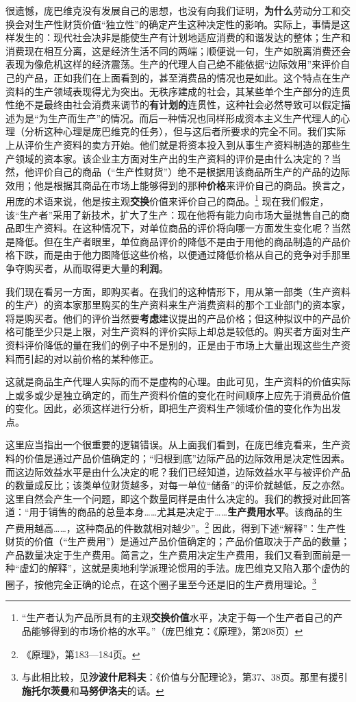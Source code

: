 \documentclass[fontset=fandol, a4paper, 12pt, openright]{ctexbook}
\begin{document}
很遗憾，庞巴维克没有发展自己的思想，也没有向我们证明，\textbf{为什么}劳动分工和交换会对生产性财货价值“独立性”的确定产生这种决定性的影响。实际上，事情是这样发生的：现代社会决非是能使生产有计划地适应消费的和谐发达的整体；生产和消费现在相互分离，这是经济生活不同的两端；顺便说一句，生产如脱离消费还会表现为像危机这样的经济震荡。生产的代理人自己绝不能依据“边际效用”来评价自己的产品，正如我们在上面看到的，甚至消费品的情况也是如此。这个特点在生产资料的生产领域表现得尤为突出。无秩序建成的社会，其某些单个生产部分的连贯性绝不是最终由社会消费来调节的\textbf{有计划的}连贯性，这种社会必然导致可以假定描述为是“为生产而生产”的情况。而后一种情况也同样形成资本主义生产代理人的心理（分析这种心理是庞巴维克的任务），但与这后者所要求的完全不同。我们实际上从评价生产资料的卖方开始。他们就是将资本投入到从事生产资料制造的那些生产领域的资本家。该企业主方面对生产出的生产资料的评价是由什么决定的？当然，他评价自己的商品（“生产性财货”）绝不是根据用该商品所生产的产品的边际效用；他是根据其商品在市场上能够得到的那种\textbf{价格}来评价自己的商品。换言之，用庞的术语来说，他是按主观\textbf{交换}价值来评价自己的商品。\footnote{“生产者认为产品所具有的主观\textbf{交换价值}水平，决定于每一个生产者自己的产品能够得到的市场价格的水平。”（庞巴维克：《原理》，第208页）} 现在我们假定，该“生产者”采用了新技术，扩大了生产：现在他将有能力向市场大量抛售自己的商品即生产资料。在这种情况下，对单位商品的评价将向哪一方面发生变化呢？当然是降低。但在生产者眼里，单位商品评价的降低不是由于用他的商品制造的产品价格下跌，而是由于他力图降低这些价格，以便通过降低价格从自己的竞争对手那里争夺购买者，从而取得更大量的\textbf{利润}。

我们现在看另一方面，即购买者。在我们的这种情形下，用从第一部类（生产资料的生产）的资本家那里购买的生产资料来生产消费资料的那个工业部门的资本家，将是购买者。他们的评价当然要\textbf{考虑}建议提出的产品价格；但这种拟议中的产品价格可能至少只是上限，对生产资料的评价实际上却总是较低的。购买者方面对生产资料评价降低的量在我们的例子中不是别的，正是由于市场上大量出现这些生产资料而引起的对以前价格的某种修正。

这就是商品生产代理人实际的而不是虚构的心理。由此可见，生产资料的价值实际上或多或少是独立确定的，而生产资料价值的变化在时间顺序上应先于消费品价值的变化。因此，必须这样进行分析，即把生产资料生产领域价值的变化作为出发点。

这里应当指出一个很重要的逻辑错误。从上面我们看到，在庞巴维克看来，生产资料的价值是通过产品价值确定的；“归根到底”边际产品的边际效用是决定性因素。而这边际效益水平是由什么决定的呢？我们已经知道，边际效益水平与被评价产品的数量成反比；该类单位财货越多，对每一单位“储备”的评价就越低，反之亦然。这里自然会产生一个问题，即这个数量同样是由什么决定的。我们的教授对此回答道：“用于销售的商品的总量本身……尤其是决定于……\textbf{生产费用水平}。该商品的生产费用越高……，这种商品的件数就相对越少”。\footnote{《原理》，第183—184页。} 因此，得到下述“解释”：生产性财货的价值（“生产费用”）是通过产品价值确定的；产品价值取决于产品的数量；产品数量决定于生产费用。简言之，生产费用决定生产费用，我们又看到面前是一种“虚幻的解释”，这就是奥地利学派理论惯用的手法。庞巴维克又陷入那个虚伪的圈子，按他完全正确的论点，在这个圈子里至今还是旧的生产费用理论。\footnote{与此相比较，见\textbf{沙波什尼科夫}：《价值与分配理论》，第37、38页。那里有援引\textbf{施托尔茨曼}和\textbf{马努伊洛夫}的话。}
\end{document}
